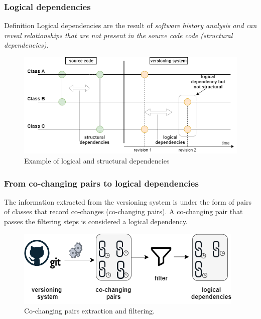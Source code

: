 \documentclass{beamer}
\begin{document}

 \begin{frame}
\frametitle{Logical dependencies}
\begin{block}{Definition}
 Logical dependencies are the result of \it{software history analysis} and can reveal relationships that are not present in the source code code (structural dependencies).
\end{block}

\begin{center}
     \begin{figure}
	\includegraphics[width=\textwidth]{fig1.png}
	\caption{\label{fig:fig1}Example of logical and structural dependencies}
     \end{figure}
\end{center}

\end{frame}

 \begin{frame}
\frametitle{From co-changing pairs to logical dependencies}
The information extracted from the versioning system is under the form of pairs of classes that record co-changes (co-changing pairs). A co-changing pair that passes the filtering steps is considered a logical dependency.

\begin{center}
     \begin{figure}
	\includegraphics[width=\textwidth]{co-change_to_ld.png}
	\caption{\label{fig:fig1}Co-changing pairs extraction and filtering.}
     \end{figure}
\end{center}
\end{frame}
\end{document}
